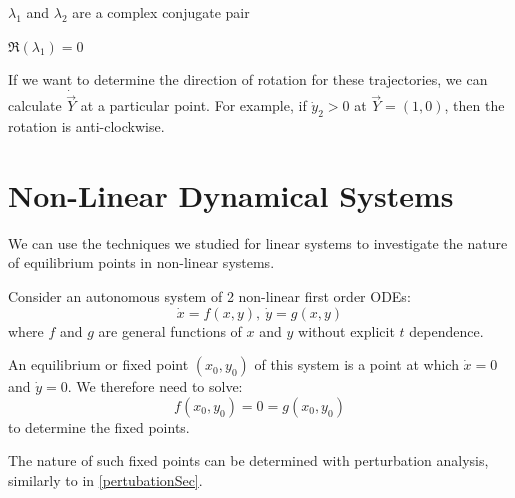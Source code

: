 \documentclass[../main.tex]{subfiles}
\begin{document}
\begin{proofcases}
\begin{case}{$\lambda_1$ and $\lambda_2$ are a complex conjugate pair}
\begin{proofcases}
\begin{case}{$\Re(\lambda_1) = 0$}
\begin{center}
        \end{center}
        If we want to determine the direction of rotation for these trajectories, we can calculate $\dot{\vec{Y}}$ at a particular point.
        For example, if $\dot{y}_2 > 0$ at $\vec{Y} = (1, 0)$, then the rotation is anti-clockwise.
      \end{case}
    \end{proofcases}
  \end{case}
\end{proofcases}
\section{Non-Linear Dynamical Systems}
We can use the techniques we studied for linear systems to investigate the nature of equilibrium points in non-linear systems.

Consider an autonomous system of 2 non-linear first order ODEs:
\[
  \dot{x} = f(x, y),\ \dot{y} = g(x, y)
\]
where $f$ and $g$ are general functions of $x$ and $y$ without explicit $t$ dependence.

An equilibrium or fixed point $(x_0, y_0)$ of this system is a point at which $\dot{x} = 0$ and $\dot{y} = 0$.
We therefore need to solve:
\[
  f(x_0, y_0) = 0 = g(x_0, y_0)
\]
to determine the fixed points.

The nature of such fixed points can be determined with perturbation analysis, similarly to in \cref{pertubationSec}.
\end{document}
